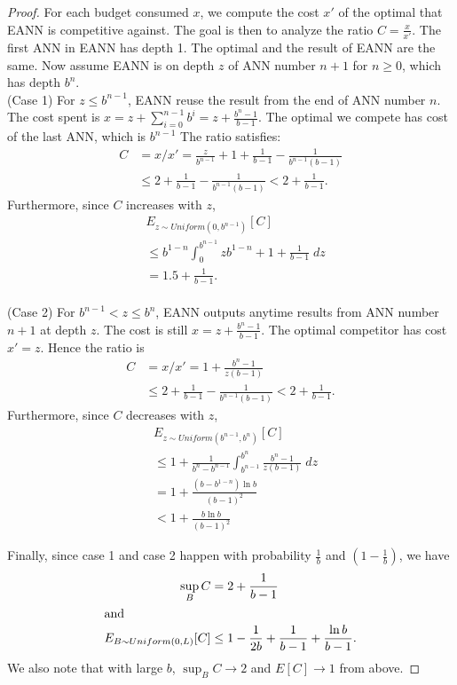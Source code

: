 \begin{proof}
For each budget consumed $x$, we compute the cost $x'$ of the optimal that EANN is competitive against. The goal is then to analyze the ratio $C = \frac{x}{x'}$. 
The first ANN in EANN has depth 1. The optimal and the result of EANN are the same. Now assume EANN is on depth $z$ of ANN number $n+1$ for $n\geq 0$, which has depth $b^{n}$. \\
(Case 1) For $z \leq b^{n-1}$, EANN reuse the result from the end of ANN number $n$. 
The cost spent is $x = z + \sum _{i=0}^{n-1} b^i = z + \frac{b^n-1}{b-1}$. 
The optimal we compete has cost of the last ANN, which is $b^{n-1}$
The ratio satisfies:
\begin{align*} 
C &= x / x' = \frac{z}{b^{n-1}} + 1 + \frac{1}{b-1} - \frac{1}{b^{n-1}(b-1)} \\
&\leq 2 + \frac{1}{b-1} - \frac{1}{b^{n-1}(b-1)} 
< 2+ \frac{1}{b-1}. 
\end{align*}
Furthermore, since $C$ increases with $z$, 
\begin{align*}
&E_{z \sim Uniform(0, b^{n-1})}[C] \\
&\leq b^{1-n} \int _0 ^{b^{n-1}} 
    z b^{1-n}+ 1 + \frac{1}{b-1} \;dz \\
&= 1.5 + \frac{1}{b-1}.
\end{align*}
\\
(Case 2) For $b^{n-1} < z \leq b^n$, EANN outputs anytime results from ANN number $n+1$ at depth $z$. 
The cost is still $x = z +\frac{b^n-1}{b-1}$. The optimal competitor has cost $x' = z$.  Hence the ratio is 
\begin{align*}
C &= x/ x' = 1 + \frac{b^n-1}{z(b-1)} \\
&\leq 2 + \frac{1}{b-1} - \frac{1}{b^{n-1}(b-1)} 
< 2+ \frac{1}{b-1}.
\end{align*}
Furthermore, since $C$ decreases with $z$, 
\begin{align*}
&E_{z \sim Uniform(b^{n-1}, b^n)}[C] \\
& \leq 1 +  
   \frac{1}{b^n - b^{n-1}} \int _{b^{n-1}} ^{b^{n}} 
        \frac{b^n -1}{z(b-1)} \; dz  \\
&= 1 + \frac{(b - b^{1-n}) \ln{b}}{(b-1)^2} \\
&< 1 + \frac{b \ln{b}}{(b-1)^2} 
\end{align*}

Finally, since case 1 and case 2 happen with probability $\frac{1}{b}$ and $(1-\frac{1}{b})$, we have
\begin{align}
    \sup _B C &= 2+ \frac{1}{b-1} \\
\intertext{and}
    E_{B\sim Uniform(0, L)}[C] &\leq 1 - \frac{1}{2b} + \frac{1}{b-1} + \frac{\ln{b}}{b-1}.
\end{align}
We also note that with large $b$, $\sup _B C \rightarrow 2$ and $E[C] \rightarrow 1$ from above.
\end{proof}

